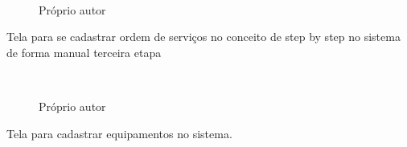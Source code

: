 \begin{figure}[H]
		\caption{\label{step_2}Próprio autor}
	\centering
	\mbox{%
		\qquad
	}
	
\end{figure}
\newpage

Tela para se cadastrar ordem de serviços no conceito de  step by step no sistema de forma manual terceira etapa

\begin{figure}[H]
		\caption{\label{step_3}Próprio autor}
	\centering
	\mbox{%
		\qquad
	}
	
\end{figure}
\newpage

Tela para cadastrar equipamentos no sistema.

